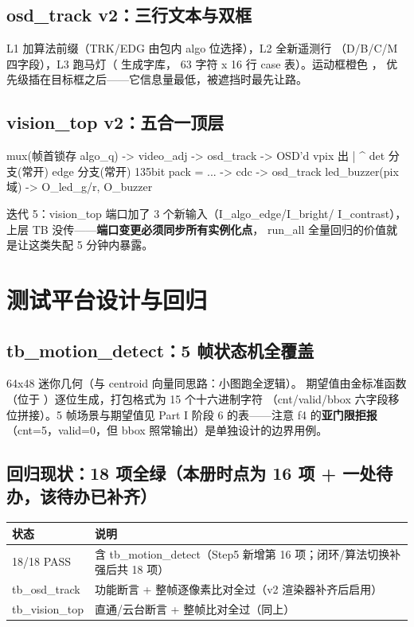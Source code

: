 \subsection{osd\_track v2：三行文本与双框}

L1 加算法前缀（TRK/EDG 由包内 algo 位选择），L2 全新遥测行
（D/B/C/M 四字段），L3 跑马灯（ 生成字库，
63 字符 x 16 行 case 表）。运动框橙色 ，
优先级插在目标框之后——它信息量最低，被遮挡时最先让路。

\subsection{vision\_top v2：五合一顶层}

\begin{Verilog}
mux(帧首锁存 algo_q) -> video_adj -> osd_track -> OSD'd vpix 出
     |             ^
det 分支(常开)   edge 分支(常开)
135bit pack = {...}  -> cdc -> osd_track
led_buzzer(pix 域)   -> O_led_g/r, O_buzzer
\end{Verilog}

迭代 5：vision\_top 端口加了 3 个新输入（I\_algo\_edge/I\_bright/
I\_contrast），上层 TB 没传——\textbf{端口变更必须同步所有实例化点}，
run\_all 全量回归的价值就是让这类失配 5 分钟内暴露。

\section{测试平台设计与回归}

\subsection{tb\_motion\_detect：5 帧状态机全覆盖}

64x48 迷你几何（与 centroid 向量同思路：小图跑全逻辑）。
期望值由金标准函数 （位于
）逐位生成，打包格式为 15 个十六进制字符
（cnt/valid/bbox 六字段移位拼接）。5 帧场景与期望值见
Part I 阶段 6 的表——注意 f4 的\textbf{亚门限拒报}
（cnt=5，valid=0，但 bbox 照常输出）是单独设计的边界用例。

\subsection{回归现状：18 项全绿（本册时点为 16 项 + 一处待办，该待办已补齐）}

\begin{center}
\begin{tabular}{ll}
\toprule
\rowcolor{rowtint}\textbf{状态} & \textbf{说明} \\
\midrule
18/18 PASS & 含 tb\_motion\_detect（Step5 新增第 16 项；闭环/算法切换补强后共 18 项） \\
tb\_osd\_track & 功能断言 + 整帧逐像素比对全过（v2 渲染器补齐后启用） \\
tb\_vision\_top & 直通/云台断言 + 整帧比对全过（同上） \\
\bottomrule
\end{tabular}
\end{center}

